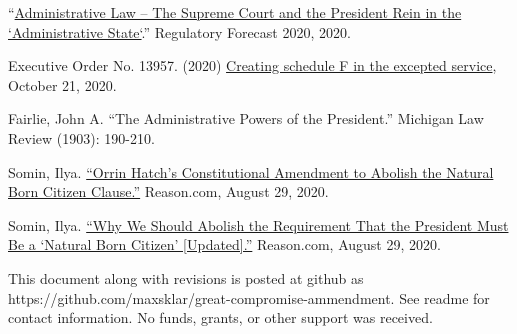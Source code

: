 \documentclass{article}
\newcommand{\quotes}[1]{``#1''}
\begin{document}
\begin{thebibliography}{20}
\quotes{\href{https://www.crowell.com/a/web/bomv5ATK9LZPNrBA51skWq/4TtiyY/Regulatory-Forecast-2020-Administrative-Law-Crowell-Moring.pdf }{Administrative Law – The Supreme Court and the President Rein in the `Administrative State`}.} Regulatory Forecast 2020, 2020. 

Executive Order No. 13957. (2020) \href{https://www.
federalregister.gov/documents/2020/10/26/2020-23780/creating-schedule-f-in-the-excepted-service}{Creating schedule F in the excepted service}, October 21, 2020.

Fairlie, John A. \quotes{The Administrative Powers of the President.} Michigan Law Review (1903): 190-210.

Somin, Ilya. \href{https://reason.com/volokh/2020/08/16/orrin-hatchs-constitutional-amendment-to-abolish-the-natural-born-citizen-clause/}{\quotes{Orrin Hatch’s Constitutional Amendment to Abolish the Natural Born Citizen Clause.}} Reason.com, August 29, 2020.

Somin, Ilya. \href{https://reason.com/volokh/2020/08/14/why-we-should-abolish-the-requirement-that-the-president-must-be-a-natural-born-citizen/}{\quotes{Why We Should Abolish the Requirement That the President Must Be a ‘Natural Born Citizen’ [Updated].}} Reason.com, August 29, 2020. 

\end{thebibliography}

This document along with revisions is posted at github as https://github.com/maxsklar/great-compromise-ammendment. See readme for contact information. No funds, grants, or other support was received.
\end{document}
